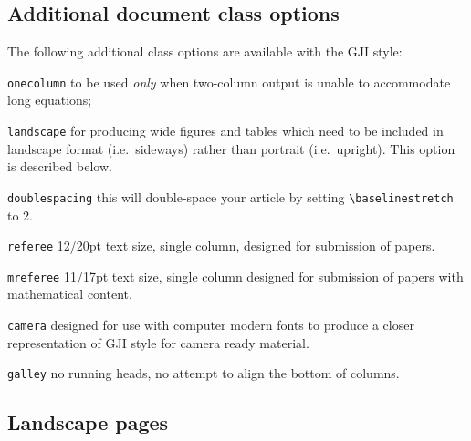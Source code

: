 \subsection{Additional document class options}\label{classoptions}

The following additional class options are available with the GJI style:
\begin{description}
  \item \texttt{onecolumn} \textendash{} to be used \textit{only} when two-column output
        is unable to accommodate long equations;
  \item \texttt{landscape} \textendash{} for producing wide figures and tables which
        need to be included in landscape format (i.e.\ sideways) rather
        than portrait (i.e.\ upright). This option is described below.
  \item \texttt{doublespacing} \textendash{} this will double-space your
        article by setting \verb"\baselinestretch" to 2.
  \item \texttt{referee} \textendash{} 12/20pt text size, single column,
        designed for submission of papers.
  \item \texttt{mreferee} \textendash{} 11/17pt text size, single column
        designed for submission of papers with mathematical content.
  \item \texttt{camera} \textendash{} designed for use with computer modern fonts to
        produce a closer representation of GJI style for camera
        ready material.
  \item \texttt{galley} \textendash{} no running heads, no attempt to align
        the bottom of columns.
\end{description}


\subsection{Landscape pages}

